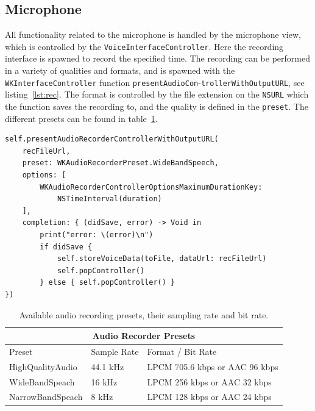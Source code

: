 \subsection{Microphone}
All functionality related to the microphone is handled by the microphone view,
which is controlled by the \texttt{VoiceInterfaceController}.
Here the recording interface is spawned to record the specified time. The
recording can be performed in a variety of qualities and formats, and is spawned
with the \texttt{WKInterfaceController} function
\texttt{presentAudioCon}-\texttt{trollerWithOutputURL}, see listing~\ref{lst:rec}. The format is
controlled by the file extension on the \texttt{NSURL} which the function saves
the recording to, and the quality is defined in the \texttt{preset}. The
different presets can be found in table~\ref{tbl:rec}.

\begin{lstlisting}[label={lst:rec}, caption={Spawning of the audio recording
    controller.},basicstyle=\small]
self.presentAudioRecorderControllerWithOutputURL(
    recFileUrl,
    preset: WKAudioRecorderPreset.WideBandSpeech,
    options: [
        WKAudioRecorderControllerOptionsMaximumDurationKey: 
            NSTimeInterval(duration)
    ],
    completion: { (didSave, error) -> Void in
        print("error: \(error)\n")
        if didSave {
            self.storeVoiceData(toFile, dataUrl: recFileUrl)
            self.popController()
        } else { self.popController() }
})
\end{lstlisting}

\begin{table}[!h]
\caption{Available audio recording presets, their sampling rate and bit rate.}
\label{tbl:rec}
\centering
\begin{tabular}{ |l|l|l|  }
\hline
\multicolumn{3}{|c|}{Audio Recorder Presets} \\
\hline
Preset             & Sample Rate & Format / Bit Rate\\
\hline
HighQualityAudio   & 44.1 kHz    & LPCM 705.6 kbps or AAC 96 kbps \\
WideBandSpeach     & 16 kHz      & LPCM 256 kbps or AAC 32 kbps \\
NarrowBandSpeach   & 8 kHz       & LPCM 128 kbps or AAC 24 kbps \\
\hline
\end{tabular}
\end{table}

